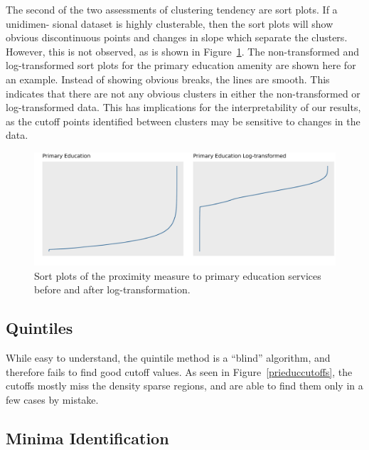\documentclass[11pt, a4paper]{article}
\begin{document}
The second of the two assessments of clustering tendency are sort plots. If a unidimen- sional dataset is highly clusterable, then the sort plots will show obvious discontinuous points and changes in slope which separate the clusters. However, this is not observed, as is shown in Figure~\ref{sortplotcompare}. The non-transformed and log-transformed sort plots for the primary education amenity are shown here for an example. Instead of showing obvious breaks, the lines are smooth. This indicates that there are not any obvious clusters in either the non-transformed or log-transformed data. This has implications for the interpretability of our results, as the cutoff points identified between clusters may be sensitive to changes in the data.






\begin{figure}[H]
\centering
\includegraphics[width=\textwidth]{./sort_plot/sort_comparison.png}
\caption[Primary education sort plot]{Sort plots of the proximity measure to primary education services before and after log-transformation.}\label{sortplotcompare}
\end{figure}








\subsection{Quintiles}

While easy to understand, the quintile method is a ``blind'' algorithm, and therefore fails to find good cutoff values. As seen in Figure~\ref{prieduccutoffs}, the cutoffs mostly miss the density sparse regions, and are able to find them only in a few cases by mistake.






\subsection{Minima Identification}
\end{document}

